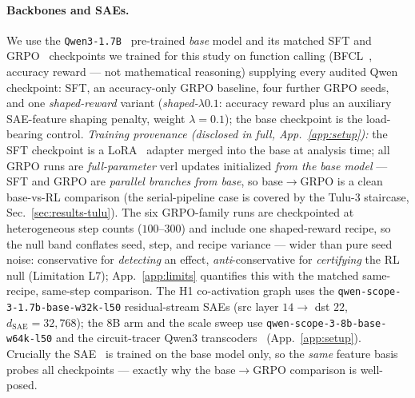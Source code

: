 \documentclass{article}
\begin{document}
\paragraph{Backbones and SAEs.} We use the \texttt{Qwen3-1.7B}~\citep{yang2025qwen3} pre-trained \emph{base} model and its matched SFT and GRPO~\citep{shao2024deepseekmath} checkpoints we trained for this study on function calling (BFCL~\citep{patil2024bfcl}, accuracy reward --- not mathematical reasoning) supplying every audited Qwen checkpoint: SFT, an accuracy-only GRPO baseline, four further GRPO seeds, and one \emph{shaped-reward} variant (\emph{shaped-}$\lambda0.1$: accuracy reward plus an auxiliary SAE-feature shaping penalty, weight $\lambda{=}0.1$); the base checkpoint is the load-bearing control. \emph{Training provenance (disclosed in full, App.~\ref{app:setup}):} the SFT checkpoint is a LoRA~\citep{hu2021lora} adapter merged into the base at analysis time; all GRPO runs are \emph{full-parameter} verl updates initialized \emph{from the base model} --- SFT and GRPO are \emph{parallel branches from base}, so base$\to$GRPO is a clean base-vs-RL comparison (the serial-pipeline case is covered by the Tulu-3 staircase, Sec.~\ref{sec:results-tulu}). The six GRPO-family runs are checkpointed at heterogeneous step counts ($100$--$300$) and include one shaped-reward recipe, so the null band conflates seed, step, and recipe variance --- wider than pure seed noise: conservative for \emph{detecting} an effect, \emph{anti}-conservative for \emph{certifying} the RL null (Limitation L7); App.~\ref{app:limits} quantifies this with the matched same-recipe, same-step comparison. The H1 co-activation graph uses the \texttt{qwen-scope-3-1.7b-base-w32k-l50} residual-stream SAEs (src layer $14\to$ dst $22$, $d_{\text{SAE}}=32{,}768$); the 8B arm and the scale sweep use \texttt{qwen-scope-3-8b-base-w64k-l50} and the circuit-tracer Qwen3 transcoders~\citep{hanna2025circuittracer} (App.~\ref{app:setup}). Crucially the SAE~\citep{bricken2023monosemanticity,templeton2024scaling,gao2024scaling} is trained on the base model only, so the \emph{same} feature basis probes all checkpoints --- exactly why the base$\to$GRPO comparison is well-posed.
\end{document}
